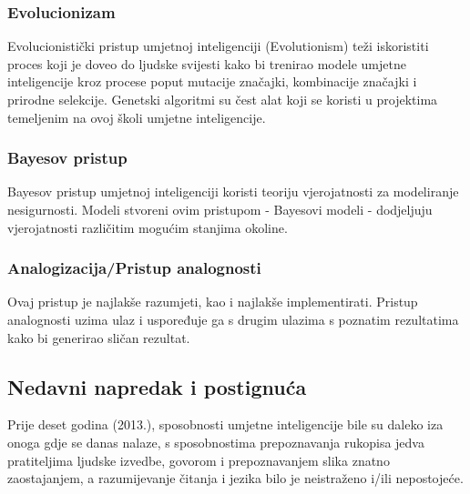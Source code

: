 \documentclass[diplomskirad]{fer}
\begin{document}
\subsubsection{Evolucionizam}
Evolucionistički pristup umjetnoj inteligenciji (Evolutionism) teži iskoristiti proces koji je doveo do ljudske svijesti kako bi trenirao modele umjetne inteligencije kroz procese poput mutacije značajki, kombinacije značajki i prirodne selekcije. Genetski algoritmi su čest alat koji se koristi u projektima temeljenim na ovoj školi umjetne inteligencije.
\subsubsection{Bayesov pristup}
Bayesov pristup umjetnoj inteligenciji koristi teoriju vjerojatnosti za modeliranje nesigurnosti. Modeli stvoreni ovim pristupom - Bayesovi modeli - dodjeljuju vjerojatnosti različitim mogućim stanjima okoline.
\subsubsection{Analogizacija/Pristup analognosti}
Ovaj pristup je najlakše razumjeti, kao i najlakše implementirati. Pristup analognosti uzima ulaz i uspoređuje ga s drugim ulazima s poznatim rezultatima kako bi generirao sličan rezultat.
\subsection{Nedavni napredak i postignuća}

Prije deset godina (2013.), sposobnosti umjetne inteligencije bile su daleko iza onoga gdje se danas nalaze, s sposobnostima prepoznavanja rukopisa jedva pratiteljima ljudske izvedbe, govorom i prepoznavanjem slika znatno zaostajanjem, a razumijevanje čitanja i jezika bilo je neistraženo i/ili nepostojeće.
\end{document}

